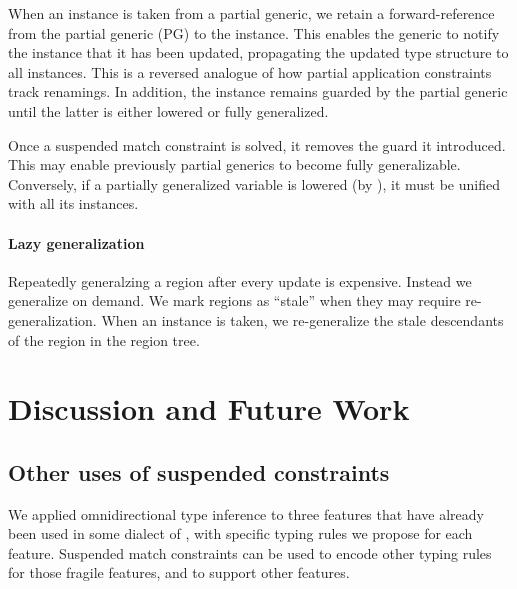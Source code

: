 \documentclass[acmsmall,screen,nonacm,review]{acmart}
\begin{document}
When an instance is taken from a partial generic, we retain a forward-reference
from the partial generic (PG) to the instance. This enables the generic to
notify the instance that it has been updated, propagating the updated type
structure to all instances. This is a reversed analogue of how partial
application constraints track renamings. In addition, the instance remains
guarded by the partial generic until the latter is either lowered or fully
generalized.

Once a suspended match constraint is solved, it removes the guard it
introduced. This may enable previously partial generics to become fully
generalizable. Conversely, if a partially generalized variable is lowered (\eg by ), it must be unified with all its instances.

\paragraph{Lazy generalization} Repeatedly generalzing a region after every update is expensive.  Instead we generalize on demand. We mark regions as ``stale'' when they may require re-generalization. When an instance is taken, we re-generalize the stale descendants of the region in the region tree.

\section{Discussion and Future Work}
\label{sec:discussion}
\label{sec:future-work}

\subsection{Other uses of suspended constraints}

We applied omnidirectional type inference to three features that have
already been used in some dialect of \ML, with specific typing rules we propose for each feature. Suspended match constraints can be used to encode other typing rules for those fragile features, and to support other features.
\end{document}
